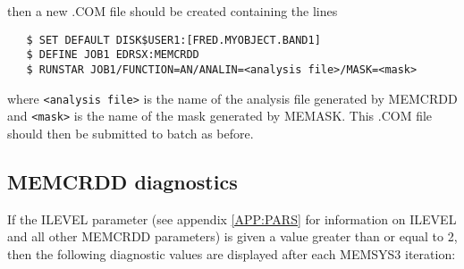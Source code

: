 then a new .COM file should be created containing the lines

\begin{verbatim}
   $ SET DEFAULT DISK$USER1:[FRED.MYOBJECT.BAND1]
   $ DEFINE JOB1 EDRSX:MEMCRDD
   $ RUNSTAR JOB1/FUNCTION=AN/ANALIN=<analysis file>/MASK=<mask>
\end{verbatim}

where \verb+<analysis file>+ is the name of the analysis file generated by
MEMCRDD and \verb+<mask>+ is the name of the mask generated by MEMASK. This
.COM file should then  be submitted to batch as before.

\subsection {MEMCRDD diagnostics}
\label {SEC:DIAG}
If the ILEVEL parameter (see appendix \ref {APP:PARS} for information on ILEVEL 
and all other MEMCRDD parameters) is given a value greater than or equal to 2,
then the following diagnostic values are displayed after each MEMSYS3 iteration:

